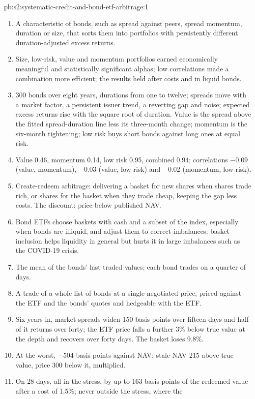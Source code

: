 \begin{solution}{pb:s2:systematic-credit-and-bond-etf-arbitrage:1}
\begin{enumerate}
\item A characteristic of bonds, such as spread against peers, spread momentum, duration or size, that sorts them into portfolios with persistently
different duration-adjusted excess returns.
\item Size, low-risk, value and momentum portfolios earned economically meaningful and statistically significant alphas; low correlations made a
combination more efficient; the results held after costs and in liquid bonds.
\item 300 bonds over eight years, durations from one to twelve; spreads move with a market factor, a persistent issuer trend, a reverting gap and
noise; expected excess returns rise with the square root of duration. Value is the spread above the fitted spread-duration line less its
three-month change; momentum is the six-month tightening; low risk buys short bonds against long ones at equal risk.
\item Value 0.46, momentum 0.14, low risk 0.95, combined 0.94; correlations $-0.09$ (value, momentum), $-0.03$ (value, low risk) and $-0.02$
(momentum, low risk).
\item Create-redeem arbitrage: delivering a basket for new shares when shares trade rich, or shares for the basket when they trade cheap, keeping the
gap less costs. The discount: price below published NAV.
\item Bond ETFs choose baskets with cash and a subset of the index, especially when bonds are illiquid, and adjust them to correct imbalances; basket
inclusion helps liquidity in general but hurts it in large imbalances such as the COVID-19 crisis.
\item The mean of the bonds' last traded values; each bond trades on a quarter of days.
\item A trade of a whole list of bonds at a single negotiated price, priced against the ETF and the bonds' quotes and hedgeable with the ETF.
\item Six years in, market spreads widen 150 basis points over fifteen days and half of it returns over forty; the ETF price falls a further 3\% below
true value at the depth and recovers over forty days. The basket loses 9.8\%.
\item At the worst, $-504$ basis points against NAV: stale NAV 215 above true value, price 300 below it, multiplied.
\item On 28 days, all in the stress, by up to 163 basis points of the redeemed value after a cost of 1.5\%; never outside the stress, where the

\end{enumerate}
\end{solution}
